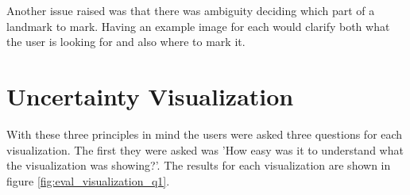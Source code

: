 Another issue raised was that there was ambiguity deciding which part of a landmark to mark. Having an example image for each would clarify both what the user is looking for and also where to mark it.


\newpage
\section{Uncertainty Visualization}\label{results:uncertainty_visualization}
With these three principles in mind the users were asked three questions for each visualization. The first they were asked was 'How easy was it to understand what the visualization was showing?'. The results for each visualization are shown in figure \ref{fig:eval_visualization_q1}.

